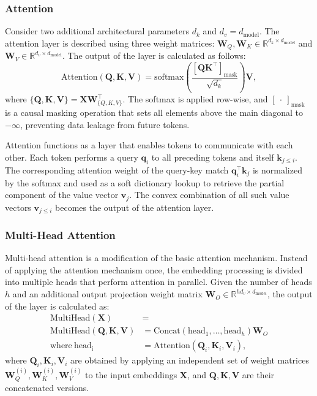 \subsubsection*{Attention}

Consider two additional architectural parameters \(d_k\) and \(d_v = d_{\mathrm{model}}\). The attention layer is described using three weight matrices: \(\mathbf{W}_Q, \mathbf{W}_K \in \mathbb{R}^{d_k \times d_{\mathrm{model}}}\) and \(\mathbf{W}_V \in \mathbb{R}^{d_v \times d_{\mathrm{model}}}\). The output of the layer is calculated as follows:
\begin{equation}
    \mathrm{Attention}(\mathbf{Q}, \mathbf{K}, \mathbf{V}) = \mathrm{softmax}\left(\frac{\left[\mathbf{QK}^\top\right]_{\mathrm{mask}}}{\sqrt{d_k}}\right)\mathbf{V},
\end{equation}
where \(\{\mathbf{Q}, \mathbf{K}, \mathbf{V}\} = \mathbf{XW}_{\{Q, K, V\}}^\top\). The softmax is applied row-wise, and \([\ \cdot \ ]_{\mathrm{mask}}\) is a causal masking operation that sets all elements above the main diagonal to \(-\infty\), preventing data leakage from future tokens.

Attention functions as a layer that enables tokens to communicate with each other. Each token performs a query \(\mathbf{q}_i\) to all preceding tokens and itself \(\mathbf{k}_{j \le i}\). The corresponding attention weight of the query-key match \(\mathbf{q}_{i}^\top\mathbf{k}_{j}\) is normalized by the softmax and used as a soft dictionary lookup to retrieve the partial component of the value vector \(\mathbf{v}_j\). The convex combination of all such value vectors \(\mathbf{v}_{j \le i}\) becomes the output of the attention layer.

\subsubsection*{Multi-Head Attention}

Multi-head attention is a modification of the basic attention mechanism. Instead of applying the attention mechanism once, the embedding processing is divided into multiple heads that perform attention in parallel. Given the number of heads \(h\) and an additional output projection weight matrix \(\mathbf{W}_O \in \mathbb{R}^{hd_v \times d_{\mathrm{model}}}\), the output of the layer is calculated as:
\begin{align}
    \mathrm{MultiHead}(\mathbf{X}) &= \\ \mathrm{MultiHead}(\mathbf{Q}, \mathbf{K}, \mathbf{V}) &= \mathrm{Concat}(\mathrm{head}_1, \ldots, \mathrm{head}_h) \mathbf{W}_O \\
    \text{where}~\mathrm{head_i} &= \mathrm{Attention}(\mathbf{Q}_i, \mathbf{K}_i, \mathbf{V}_i),
\end{align}
where \(\mathbf{Q}_i, \mathbf{K}_i, \mathbf{V}_i\) are obtained by applying an independent set of weight matrices \(\mathbf{W}_Q^{(i)}, \mathbf{W}_K^{(i)}, \mathbf{W}_V^{(i)}\) to the input embeddings \(\mathbf{X}\), and \(\mathbf{Q}, \mathbf{K}, \mathbf{V}\) are their concatenated versions.

